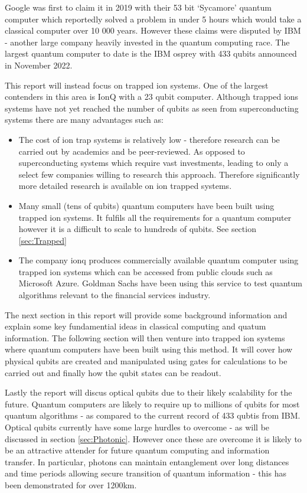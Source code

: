 Google was first to claim it in 2019 with their 53 bit `Sycamore' quantum computer which reportedly solved a problem in under 5 hours which would take a classical computer over 10 000 years. \cite{gibney_hello_2019} 
However these claims were disputed by IBM - another large company heavily invested in the quantum computing race.
The largest quantum computer to date is the IBM osprey with 433 qubits announced in November 2022.


This report will instead focus on trapped ion systems. 
One of the largest contenders in this area is IonQ with a 23 qubit computer. 
 Although trapped ions systems have not yet reached the number of qubits as seen from superconducting systems there are many advantages such as: 
\begin{itemize}
    \item The cost of ion trap systems is relatively low - therefore research can be carried out by academics and be peer-reviewed. As opposed to superconducting systems which require vast investments, leading to only a select few companies willing to research this approach. Therefore significantly more detailed research is available on ion trapped systems.  
    \item Many small (tens of qubits) quantum computers have been built using trapped ion systems. It fulfils all the requirements for a quantum computer however it is a difficult to scale to hundreds of qubits. See section \ref{sec:Trapped}
    \item The company ionq produces commercially available quantum computer using trapped ion systems which can be accessed from public clouds such as Microsoft Azure. \cite{sonialopezbravo_ionq_nodate} Goldman Sachs have been using this service to test quantum algorithms relevant to the financial services industry. \cite{noauthor_goldman_2021}
\end{itemize}




The next section in this report will provide some background information and explain some key fundamential ideas in classical computing and quatum information. 
The following section will then venture into trapped ion systems where quantum computers have been built using this method.
It will cover how physical qubits are created and manipulated using gates for calculations to be carried out and finally how the qubit states can be readout. 


Lastly the report will discus optical qubits due to their likely scalability for the future. 
Quantum computers are likely to require up to millions of qubits for most quantum algorithms - as compared to the current record of 433 qubtis from IBM. \cite{bergou_quantum_2021} 
Optical qubits currently have some large hurdles to overcome - as will be discussed in section \ref{sec:Photonic}. 
However once these are overcome it is likely to be an attractive attender for future quantum computing and information transfer.
In particular, photons can maintain entanglement over long distances and time periods allowing secure transition of quantum information - this has been demonstrated for over 1200km. \cite{yin_satellite-based_2017}